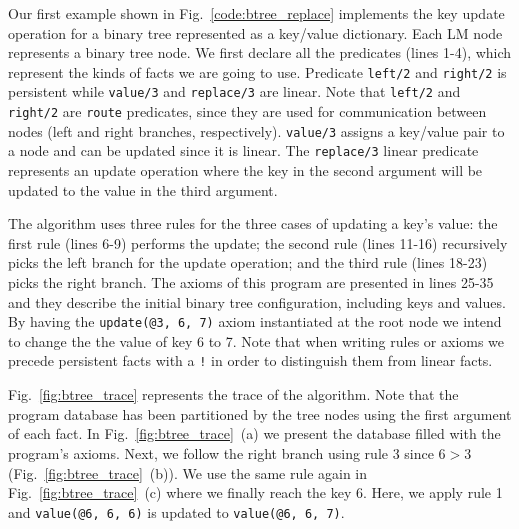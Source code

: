 Our first example shown in Fig.~\ref{code:btree_replace} implements the key update operation for a binary tree
represented as a key/value dictionary. Each LM node represents a binary tree node.
We first declare all the predicates (lines 1-4), which represent the kinds of facts we are going to use.
Predicate \texttt{left/2} and \texttt{right/2} is persistent while \texttt{value/3} and \texttt{replace/3} are linear.
Note that \texttt{left/2} and \texttt{right/2} are \texttt{route} predicates, since they are used for communication
between nodes (left and right branches, respectively). \texttt{value/3} assigns a key/value pair to a node and can
be updated since it is linear. The \texttt{replace/3} linear predicate represents an update operation where the key in
the second argument will be updated to the value in the third argument.

The algorithm uses three rules for the three cases of updating a key's value: the first rule (lines 6-9) performs the update;
the second rule (lines 11-16) recursively picks the left branch for the update operation; and the third rule (lines 18-23) picks the right branch.
The axioms of this program are presented in lines 25-35 and they describe the initial binary tree configuration, including keys and values.
By having the \texttt{update(@3, 6, 7)} axiom instantiated at the root node we intend to change the the value of key 6 to 7.
Note that when writing rules or axioms we precede persistent facts with a \texttt{!} in order to distinguish them from linear facts.

Fig.~\ref{fig:btree_trace} represents the trace of the algorithm. Note that the program database has been partitioned
by the tree nodes using the first argument of each fact. In Fig.~\ref{fig:btree_trace}~(a) we present the database
filled with the program's axioms. Next, we follow the right branch using rule 3 since $6 > 3$ (Fig.~\ref{fig:btree_trace}~(b)).
We use the same rule again in Fig.~\ref{fig:btree_trace}~(c) where we finally reach the key 6. Here, we apply rule 1 and
\texttt{value(@6, 6, 6)} is updated to \texttt{value(@6, 6, 7)}.

